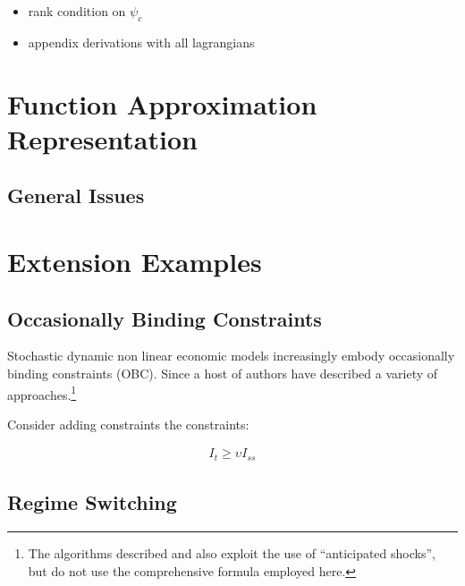 \documentclass[12pt]{article}
\begin{document}


\appendix


\begin{itemize}
\item rank condition on $\psi_c$
\item appendix derivations with all lagrangians
\end{itemize}

\section{Function Approximation Representation}
\label{sec:funcApproxRep}

\subsection{General Issues}
\label{sec:generalissues}





\section{Extension Examples}
\label{sec:extension}



\subsection{Occasionally Binding Constraints}
\label{sec:occbind}



\label{sec:obc-solut}

Stochastic dynamic non linear economic
models increasingly embody  occasionally binding constraints (OBC).
Since \cite{Christiano2000} a host of
authors have described a variety of approaches.\footnote{The algorithms described \cite{holden15:_exist_dsge} and \cite{guerrieri15:_occbin} also exploit the use of ``anticipated shocks'', but do not use the comprehensive formula employed here. }
\cite{holden15:_exist_dsge,guerrieri15:_occbin,benigno09,hintermaier10,brumm10,nakov08,haefke98,nakata12,gordon11,billi11,Hintermaier2010,Guerrieri2015}



Consider adding constraints the constraints:

\begin{gather*}
  I_t \ge \upsilon I_{ss}
\end{gather*}


\subsection{Regime Switching}
\label{sec:ressw}
\end{document}
